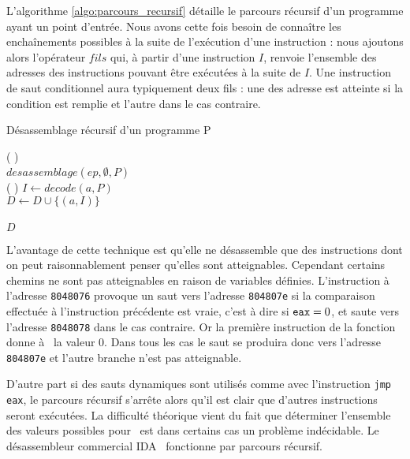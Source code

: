 L'algorithme \ref{algo:parcours_recursif} détaille le parcours récursif d'un programme ayant un point d'entrée.
Nous avons cette fois besoin de connaître les enchaînements possibles à la suite de l'exécution d'une instruction : nous ajoutons alors l'opérateur $fils$ qui, à partir d'une instruction $I$, renvoie l'ensemble des adresses des instructions pouvant être exécutées à la suite de $I$.
Une instruction de saut conditionnel aura typiquement deux fils : une des adresse est atteinte si la condition est remplie et l'autre dans le cas contraire.

\begin{algorithm}[H] %
\caption{Désassemblage récursif d'un programme P}
\SetAlgoLined
{}
\Fn(
){}{
\\
\Return $desassemblage(ep, \emptyset, P)$
}
~\\
\Fn(
){}{
  $I\leftarrow decode(a, P)$ \\
  $D\leftarrow D\cup \{(a, I)\}$ \\
  \\
  {
  }
  \Return $D$
}
\label{algo:parcours_recursif}
\end{algorithm}

L'avantage de cette technique est qu'elle ne désassemble que des instructions dont on peut raisonnablement penser qu'elles sont atteignables.
Cependant certains chemins ne sont pas atteignables en raison de variables définies. 
L'instruction à l'adresse \texttt{8048076} provoque un saut vers l'adresse \texttt{804807e} si la comparaison effectuée à l'instruction précédente est vraie, c'est à dire si $\texttt{eax}=0$, et saute vers l'adresse \texttt{8048078} dans le cas contraire.
Or la première instruction de la fonction donne à \eax\ la valeur 0. Dans tous les cas le saut se produira donc vers l'adresse \texttt{804807e} et l'autre branche n'est pas atteignable.

D'autre part si des sauts dynamiques sont utilisés comme avec l'instruction \texttt{jmp eax}, le parcours récursif s'arrête alors qu'il est clair que d'autres instructions seront exécutées.
La difficulté théorique vient du fait que déterminer l'ensemble des valeurs possibles pour \eax\ est dans certains cas un problème indécidable.
Le désassembleur commercial IDA~\cite{IDA} fonctionne par parcours récursif.


